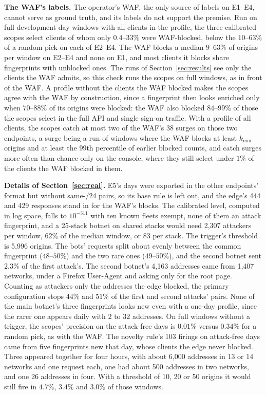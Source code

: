 \documentclass[conference,letterpaper,10pt]{IEEEtran}
\newcommand\1{\textit{(i)}}
\newcommand\2{\textit{(ii)}}
\newcommand\3{\textit{(iii)}}
\newcommand\4{\textit{(iv)}}
\newcommand\5{\textit{(v)}}
\newcommand\6{\textit{(vi)}}
\newcommand\7{\textit{(vii)}}
\newcommand\8{\textit{(viii)}}
\newcommand\9{\textit{(ix)}}
\begin{document}
\textbf{The WAF's labels.} The operator's WAF, the only source of labels on E1--E4, cannot serve as ground truth, and its labels do not support the premise. Run on full development-day windows with all clients in the profile, the three calibrated scopes select clients of whom only $0.4$--$33\%$ were WAF-blocked, below the $10$--$63\%$ of a random pick on each of E2--E4. The WAF blocks a median $9$--$63\%$ of origins per window on E2--E4 and none on E1, and most clients it blocks share fingerprints with unblocked ones. The runs of Section~\ref{sec:results} see only the clients the WAF admits, so this check runs the scopes on full windows, as in front of the WAF. A profile without the clients the WAF blocked makes the scopes agree with the WAF by construction, since a fingerprint then looks enriched only when $70$--$88\%$ of its origins were blocked: the WAF also blocked $84$--$99\%$ of those the scopes select in the full API and single sign-on traffic. With a profile of all clients, the scopes catch at most two of the WAF's 38 surges on those two endpoints, a surge being a run of windows where the WAF blocks at least $k_{\min}$ origins and at least the 99th percentile of earlier blocked counts, and catch surges more often than chance only on the console, where they still select under $1\%$ of the clients the WAF blocked in them.

\textbf{Details of Section~\ref{sec:real}.} E5's days were exported in the other endpoints' format but without same-/24 pairs, so its base rule is left out, and the edge's 444 and 429 responses stand in for the WAF's blocks. The calibrated level, computed in log space, falls to $10^{-311}$ with ten known fleets exempt, none of them an attack fingerprint, and a 25-stack botnet on shared stacks would need 2,307 attackers per window, $62\%$ of the median window, or 83 per stack. The trigger's threshold is 5,996 origins. The bots' requests split about evenly between the common fingerprint ($48$--$50\%$) and the two rare ones ($49$--$50\%$), and the second botnet sent $2.3\%$ of the first attack's. The second botnet's 4,163 addresses came from 1,407 networks, under a Firefox User-Agent and asking only for the root page. Counting as attackers only the addresses the edge blocked, the primary configuration stops $44\%$ and $51\%$ of the first and second attacks' pairs.   None of the main botnet's three fingerprints looks new even with a one-day profile, since the rarer one appears daily with 2 to 32 addresses. On full windows without a trigger, the scopes' precision on the attack-free days is $0.01\%$ versus $0.34\%$ for a random pick, as with the WAF. The novelty rule's 103 firings on attack-free days came from five fingerprints new that day, whose clients the edge never blocked. Three appeared together for four hours, with about 6,000 addresses in 13 or 14 networks and one request each, one had about 500 addresses in two networks, and one 26 addresses in four. With a threshold of 10, 20 or 50 origins it would still fire in $4.7\%$, $3.4\%$ and $3.0\%$ of those windows.
\end{document}
